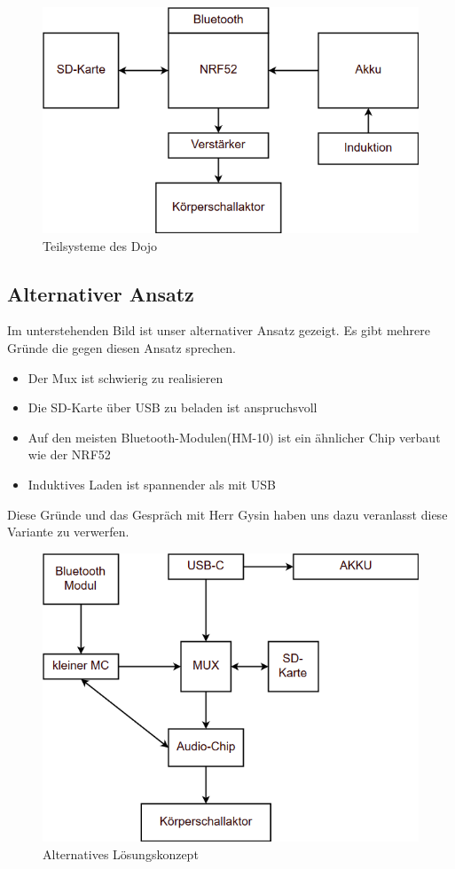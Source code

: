 \begin{figure}[H]
\begin{center}
	\includegraphics[width=120mm]{data/Loesungskonzept_Teilsysteme.png}
	\caption{Teilsysteme des Dojo} %
	\label{fig:first_layer}
\end{center}
\end{figure}


\subsection{Alternativer Ansatz}
Im unterstehenden Bild ist unser alternativer Ansatz gezeigt. Es gibt mehrere Gründe die gegen diesen Ansatz sprechen.
\begin{itemize}
\item Der Mux ist schwierig zu realisieren
\item Die SD-Karte über USB zu beladen ist anspruchsvoll
\item Auf den meisten Bluetooth-Modulen(HM-10) ist ein ähnlicher Chip verbaut wie der NRF52
\item Induktives Laden ist spannender als mit USB
\end{itemize}
Diese Gründe und das Gespräch mit Herr Gysin haben uns dazu veranlasst diese Variante zu verwerfen.

\begin{figure}[H]
\begin{center}
	\includegraphics[width=120mm]{data/Loesungskonzept_alternativ.png}
	\caption{Alternatives Lösungskonzept} %
	\label{fig:first_layer}
\end{center}
\end{figure}


